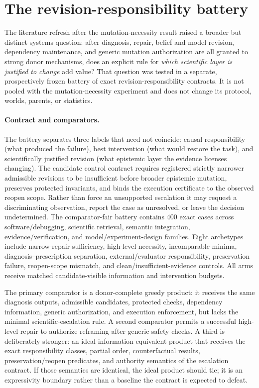 \section{The revision-responsibility battery}
\label{sec:revision}

The literature refresh after the mutation-necessity result raised a broader but
distinct systems question: after diagnosis, repair, belief and model revision,
dependency maintenance, and generic mutation authorization are all granted to
strong donor mechanisms, does an explicit rule for \emph{which scientific layer
is justified to change} add value? That question was tested in a separate,
prospectively frozen battery of exact revision-responsibility contracts. It is
not pooled with the mutation-necessity experiment and does not change its
protocol, worlds, parents, or statistics.

\paragraph{Contract and comparators.}
The battery separates three labels that need not coincide: causal responsibility
(what produced the failure), best intervention (what would restore the task),
and scientifically justified revision (what epistemic layer the evidence
licenses changing). The candidate control contract requires registered strictly
narrower admissible revisions to be insufficient before broader epistemic
mutation, preserves protected invariants, and binds the execution certificate to
the observed reopen scope. Rather than force an unsupported escalation it may
request a discriminating observation, report the case as unresolved, or leave
the decision undetermined. The comparator-fair battery contains 400 exact cases
across software/debugging, scientific retrieval, semantic integration,
evidence/verification, and model/experiment-design families. Eight archetypes
include narrow-repair sufficiency, high-level necessity, incomparable minima,
diagnosis--prescription separation, external/evaluator responsibility,
preservation failure, reopen-scope mismatch, and clean/insufficient-evidence
controls. All arms receive matched candidate-visible information and
intervention budgets.

The primary comparator is a donor-complete greedy product: it receives the same
diagnosis outputs, admissible candidates, protected checks, dependency
information, generic authorization, and execution enforcement, but lacks the
minimal scientific-escalation rule. A second comparator permits a successful
high-level repair to authorize reframing after generic safety checks. A third is
deliberately stronger: an ideal information-equivalent product that receives the
exact responsibility classes, partial order, counterfactual results,
preservation/reopen predicates, and authority semantics of the escalation
contract. If those semantics are identical, the ideal product should tie; it is
an expressivity boundary rather than a baseline the contract is expected to
defeat.

